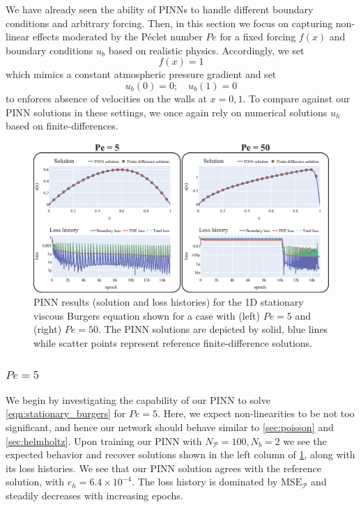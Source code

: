 \documentclass[11pt]{article}
\newcommand{\mse}{\textrm{MSE}}
\newcommand{\pde}{\ensuremath{\mathcal{P}}}
\begin{document}
We have already seen the ability of PINNs to handle different boundary conditions and
arbitrary forcing. Then, in this section we focus on capturing non-linear
effects moderated by the Péclet number \(Pe\) for a fixed forcing \(f(x)\) and boundary
conditions \(u_b\) based on realistic physics. Accordingly, we set
\[ f(x) = 1\]
which mimics a constant atmospheric pressure gradient and set
\[ u_b(0) = 0;\quad  u_b(1) = 0\]
to enforces absence of velocities on the walls at \(x = 0, 1\).
To compare against our PINN solutions in these settings, we once again rely
on numerical solutions \({u}_h\) based on finite-differences.
\begin{figure}[htbp]
\centering
\includegraphics[width=1.0\textwidth]{images/stat_viscous_burgers.eps}
\caption{\label{fig:stat_viscous_burgers_results}PINN results (solution and loss histories) for the 1D stationary viscous Burgers equation shown for a case with (left) \(Pe = 5\) and (right) \(Pe = 50\). The PINN solutions are depicted by solid, blue lines while scatter points represent reference finite-difference solutions.}
\end{figure}

\subsubsection{\(Pe = 5\)}
\label{sec:orgeb915d3}
We begin by investigating the capability of our PINN to solve
\cref{eqn:stationary_burgers} for \(Pe = 5\). Here, we expect
non-linearities to be not too significant, and hence our network should behave
similar to \cref{sec:poisson} and
\cref{sec:helmholtz}. Upon training our PINN with \(N_\pde = 100 , N_b = 2\) we
see the expected behavior and recover solutions
shown in the left column of \cref{fig:stat_viscous_burgers_results}, along with its loss
histories. We see that our PINN solution agrees with the reference solution,
with \(e_h = 6.4 \times 10^{-4}\). The loss history is dominated by \(\mse_\pde\) and steadily decreases with increasing epochs.
\end{document}
